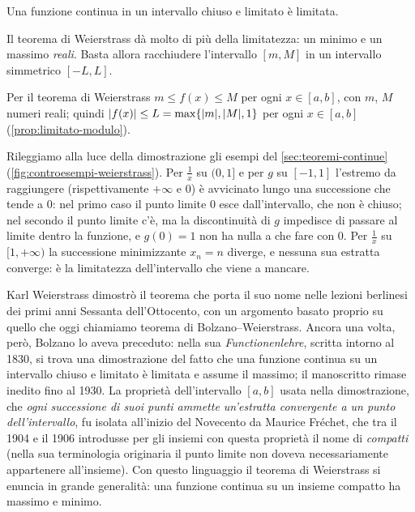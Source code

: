 \begin{corollario}\label{cor:continua-limitata}
Una funzione continua in un intervallo chiuso e limitato è limitata.
\end{corollario}

\begin{schema}
\end{schema}

\begin{strategia}
Il teorema di Weierstrass dà molto di più della limitatezza: un minimo e un massimo
\emph{reali}. Basta allora racchiudere l'intervallo $[m,M]$ in un intervallo simmetrico
$[-L,L]$.
\end{strategia}

\begin{dimostrazione}
Per il teorema di Weierstrass $m\le f(x)\le M$ per ogni $x\in[a,b]$, con $m$, $M$ numeri
reali; quindi $\lvert f(x)\rvert\le L=\max\{\lvert m\rvert,\lvert M\rvert,1\}$ per ogni $x\in[a,b]$
(\cref{prop:limitato-modulo}).
\end{dimostrazione}

Rileggiamo alla luce della dimostrazione gli esempi del \cref{sec:teoremi-continue}
(\cref{fig:controesempi-weierstrass}). Per $\frac1x$ su $(0,1]$ e per $g$ su $[-1,1]$
l'estremo da raggiungere (rispettivamente $+\infty$ e $0$) è avvicinato lungo una
successione che tende a $0$: nel primo caso il punto limite $0$ esce dall'intervallo, che
non è chiuso; nel secondo il punto limite c'è, ma la discontinuità di $g$ impedisce di
passare al limite dentro la funzione, e $g(0)=1$ non ha nulla a che fare con $0$. Per
$\frac1x$ su $[1,+\infty)$ la successione minimizzante $x_{n}=n$ diverge, e nessuna sua
estratta converge: è la limitatezza dell'intervallo che viene a mancare.

\begin{notastorica}
Karl Weierstrass dimostrò il teorema che porta il suo nome nelle lezioni berlinesi dei
primi anni Sessanta dell'Ottocento, con un argomento basato proprio su quello che oggi chiamiamo teorema di
Bolzano--Weierstrass. Ancora una volta, però, Bolzano lo aveva preceduto: nella sua
\emph{Functionenlehre}, scritta intorno al 1830, si trova una dimostrazione del fatto che
una funzione continua su un intervallo chiuso e limitato è limitata e assume il massimo;
il manoscritto rimase inedito fino al 1930. La proprietà dell'intervallo $[a,b]$ usata
nella dimostrazione, che \emph{ogni successione di suoi punti ammette un'estratta
convergente a un punto dell'intervallo}, fu isolata all'inizio del Novecento da Maurice
Fréchet, che tra il 1904 e il 1906 introdusse per gli insiemi con questa proprietà il
nome di \emph{compatti} (nella sua terminologia originaria il punto limite non doveva
necessariamente appartenere all'insieme). Con questo linguaggio il teorema di Weierstrass si enuncia in grande
generalità: una funzione continua su un insieme compatto ha massimo e minimo.
\end{notastorica}
